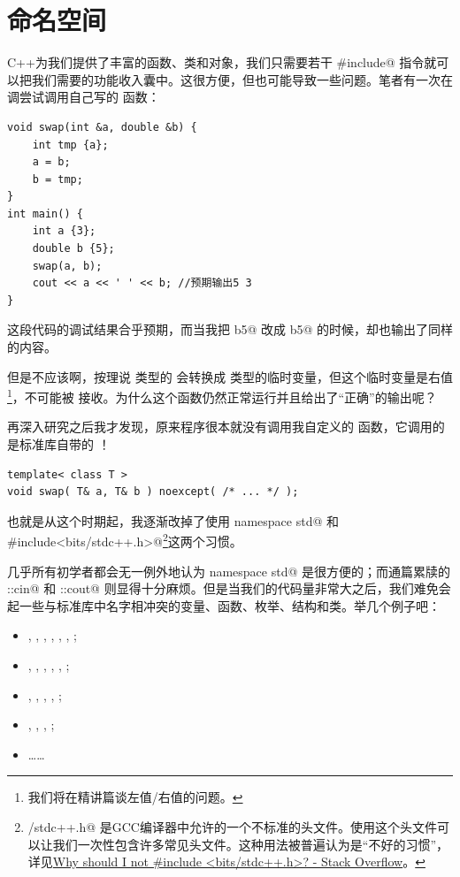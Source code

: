 \section{命名空间}
C++为我们提供了丰富的函数、类和对象，我们只需要若干 \lstinline@#include@ 指令就可以把我们需要的功能收入囊中。这很方便，但也可能导致一些问题。笔者有一次在调尝试调用自己写的 \lstinline@swap@ 函数：
\begin{lstlisting}
void swap(int &a, double &b) {
    int tmp {a};
    a = b;
    b = tmp;
}
int main() {
    int a {3};
    double b {5};
    swap(a, b);
    cout << a << ' ' << b; //预期输出5 3
}
\end{lstlisting}
这段代码的调试结果合乎预期，而当我把 \lstinline@double b{5}@ 改成 \lstinline@int b{5}@ 的时候，却也输出了同样的内容。\par
但是不应该啊，按理说 \lstinline@int@ 类型的 \lstinline@b@ 会转换成 \lstinline@double@ 类型的临时变量，但这个临时变量是右值\footnote{我们将在精讲篇谈左值/右值的问题。}，不可能被 \lstinline@swap@ 接收。为什么这个函数仍然正常运行并且给出了``正确''的输出呢？\par
再深入研究之后我才发现，原来程序很本就没有调用我自定义的 \lstinline@swap@ 函数，它调用的是标准库自带的 \lstinline@swap@！
\begin{lstlisting}
template< class T >
void swap( T& a, T& b ) noexcept( /* ... */ );
\end{lstlisting}
也就是从这个时期起，我逐渐改掉了使用 \lstinline@using namespace std@ 和 \lstinline@#include<bits/stdc++.h>@\footnote{\lstinline@bits/stdc++.h@ 是GCC编译器中允许的一个不标准的头文件。使用这个头文件可以让我们一次性包含许多常见头文件。这种用法被普遍认为是``不好的习惯''，详见\href{https://stackoverflow.com/questions/31816095/why-should-i-not-include-bits-stdc-h}{Why should I not \#include <bits/stdc++.h>? - Stack Overflow}。}这两个习惯。\par
几乎所有初学者都会无一例外地认为 \lstinline@using namespace std@ 是很方便的；而通篇累牍的 \lstinline@std::cin@ 和 \lstinline@std::cout@ 则显得十分麻烦。但是当我们的代码量非常大之后，我们难免会起一些与标准库中名字相冲突的变量、函数、枚举、结构和类。举几个例子吧：
\begin{itemize}
    \item \lstinline@list@, \lstinline@map@, \lstinline@array@, \lstinline@queue@, \lstinline@set@, \lstinline@string@, \lstinline@pair@;
    \item \lstinline@copy@, \lstinline@find@, \lstinline@move@, \lstinline@search@, \lstinline@count@, \lstinline@sample@;
    \item \lstinline@next@, \lstinline@begin@, \lstinline@end@, \lstinline@data@, \lstinline@size@;
    \item \lstinline@function@, \lstinline@future@, \lstinline@thread@, \lstinline@yield@;
    \item \ldots\ldots
\end{itemize}
